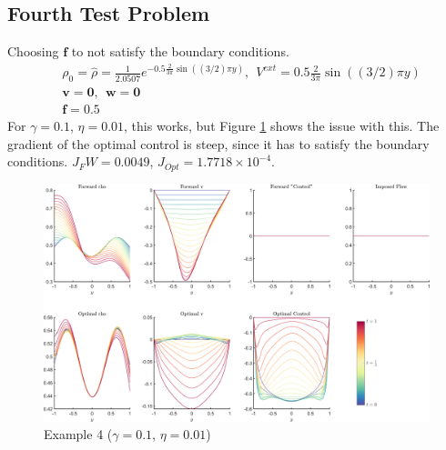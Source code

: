 \documentclass[11pt, a4paper]{article}
\theoremstyle{definition}
\newcommand{\Sta}{\rho}
\newcommand{\Stav}{\mathbf{v}}
\newcommand{\Con}{\mathbf{f}}
\begin{document}
\subsection{Fourth Test Problem}
Choosing $\Con$ to not satisfy the boundary conditions.
\begin{align*}
&\Sta_0 = \hat \Sta = \frac{1}{2.0507}e^{-0.5 \frac{2}{3 \pi}\sin((3/2)\pi y)}, \ \ V^{ext} =0.5 \frac{2}{3 \pi}\sin((3/2)\pi y)\\
&\Stav = \mathbf{0}, \ \  \mathbf{w} = \mathbf{0}\\
&\Con = 0.5
\end{align*}
For $\gamma = 0.1$, $\eta = 0.01$, this works, but Figure \ref{fig4} shows the issue with this. The gradient of the optimal control is steep, since it has to satisfy the boundary conditions. $J_FW = 0.0049$, $J_{Opt} = 1.7718 \times 10^{-4}$.

\begin{figure}
	\includegraphics[scale=0.05]{Example4.png}
	\caption{Example 4 ($\gamma = 0.1$, $\eta = 0.01$)}
	\label{fig4}
\end{figure} 
\end{document}
